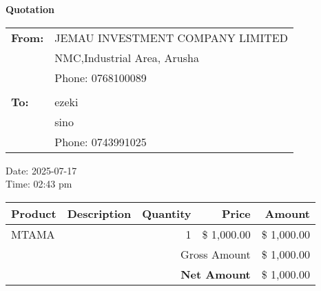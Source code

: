 \documentclass[a4paper]{article}
\begin{document}
\textbf{\Large Quotation}\\
\vspace{0.5cm}
\begin{tabular}{ll}
\textbf{From:} & JEMAU INVESTMENT COMPANY LIMITED \\
& NMC,Industrial Area, Arusha \\
& Phone: 0768100089 \\
\vspace{0.3cm} \\
\textbf{To:} & ezeki \\
& sino \\
& Phone: 0743991025 \\
\end{tabular}
\vspace{0.5cm}
Date: 2025-07-17\\
Time: 02:43 pm\\
\vspace{0.5cm}
\begin{tabular}{lp{4cm}rrr}
\toprule
Product & Description & Quantity & Price & Amount \\
\midrule
MTAMA & & 1 & \$ 1,000.00 & \$ 1,000.00 \\
\midrule
\multicolumn{4}{r}{Gross Amount} & \$ 1,000.00 \\
\multicolumn{4}{r}{\textbf{Net Amount}} & \$ 1,000.00 \\
\bottomrule
\end{tabular}
\end{document}
